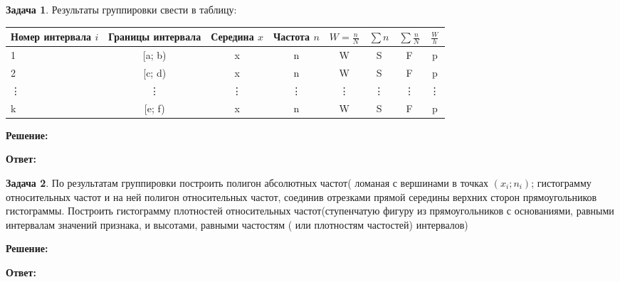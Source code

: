 \documentclass[a4paper,12pt]{article}
\theoremstyle{definition}
\newtheorem{problem}{Задача}
\newenvironment{solution}
{\begin{shaded}\textbf{Решение:}\par}
{\end{shaded}}
\newenvironment{answer}
{\par\noindent\textbf{Ответ:} \color{blue}}
{\par}
\begin{document}
\vspace{8pt}
\begin{problem}
    Результаты группировки свести в таблицу:

    \begin{table}[ht]
        \centering
        \label{tab:interval_distribution}
        \begin{adjustbox}{max width=\textwidth}
            \begin{tabular}{l c c c c c c c}
                \toprule
                Номер интервала \( i \) & 
                Границы интервала & 
                Середина \( x \) & 
                Частота \( n \) & 
                \( W = \frac{n}{N} \) & 
                \( \sum n \) & 
                \( \sum \frac{n}{N} \) & 
                \( \frac{W}{h} \) \\
                \midrule
                1 & [a; b) & x & n & W & S & F & p \\
                2 & [c; d) & x & n & W & S & F & p \\
                \vdots & \vdots & \vdots & \vdots & \vdots & \vdots & \vdots & \vdots \\
                k & [e; f) & x & n & W & S & F & p \\
                \bottomrule
            \end{tabular}
            \end{adjustbox}
        \end{table}  
    
        \begin{solution}
        \end{solution}
    
        \begin{answer}
        \end{answer}
    
    \end{problem}



\vspace{8pt}
\begin{problem}
    По результатам группировки построить полигон абсолютных частот( ломаная с
    вершинами в точках \((x_i; n_i)\); гистограмму относительных частот и на ней полигон
    относительных частот, соединив отрезками прямой середины верхних сторон
    прямоугольников гистограммы.
    Построить гистограмму плотностей относительных частот(ступенчатую фигуру
    из прямоугольников с основаниями, равными интервалам значений признака, и
    высотами, равными частостям ( или плотностям частостей) интервалов)
    
        \begin{solution}
        \end{solution}
    
        \begin{answer}
        \end{answer}
    
    \end{problem}
\end{document}
